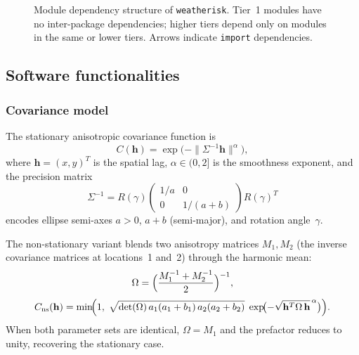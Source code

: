 \documentclass[a4paper]{elsarticle}
\begin{document}
\begin{figure}[ht]
{%
}%
\caption{Module dependency structure of \texttt{weatherisk}.
  Tier~1 modules have no inter-package dependencies;
  higher tiers depend only on modules in the same or lower tiers.
  Arrows indicate \texttt{import} dependencies.}
\label{fig:architecture}
\end{figure}

\subsection{Software functionalities}
\label{sec:functionalities}

\subsubsection{Covariance model}

The stationary anisotropic covariance function is
\begin{equation}\label{eq:cov-stat}
  C(\mathbf{h}) = \exp\!\bigl(-\|\Sigma^{-1}\mathbf{h}\|^{\alpha}\bigr),
\end{equation}
where $\mathbf{h} = (x, y)^T$ is the spatial lag,
$\alpha \in (0, 2]$ is the smoothness exponent, and the precision matrix
\begin{equation}\label{eq:sigma-inv}
  \Sigma^{-1} = R(\gamma)
  \begin{pmatrix} 1/a & 0 \\ 0 & 1/(a+b) \end{pmatrix}
  R(\gamma)^T
\end{equation}
encodes ellipse semi-axes $a > 0$, $a + b$ (semi-major), and rotation
angle~$\gamma$.

The non-stationary variant blends two anisotropy matrices
$M_1, M_2$ (the inverse covariance matrices at locations~1 and~2)
through the harmonic mean:
\begin{equation}\label{eq:omega}
  \Omega = \Bigl(\frac{M_1^{-1} + M_2^{-1}}{2}\Bigr)^{-1},
\end{equation}
\begin{equation}\label{eq:cov-nonstat}
  C_{\mathrm{ns}}(\mathbf{h}) = \min\!\Bigl(1,\;
    \sqrt{\det(\Omega)\,a_1(a_1+b_1)\,a_2(a_2+b_2)}\;
    \exp\!\bigl(-\sqrt{\mathbf{h}^T\Omega\,\mathbf{h}}^{\,\alpha}\bigr)\Bigr).
\end{equation}
When both parameter sets are identical, $\Omega = M_1$ and the prefactor
reduces to unity, recovering the stationary case.
\end{document}
